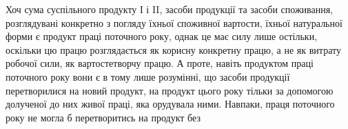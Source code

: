 Хоч сума суспільного продукту І і II, засоби продукції та засоби
споживання, розглядувані конкретно з погляду їхньої споживної вартости,
їхньої натуральної форми є продукт праці поточного року, однак це має
силу лише остільки, оскільки цю працю розглядається як корисну конкретну
працю, а не як витрату робочої сили, як вартостетворчу працю.
А проте, навіть продуктом праці поточного року вони є в тому лише розумінні,
що засоби продукції перетворилися на новий продукт, на продукт
цього року тільки за допомогою долученої до них живої праці, яка орудувала
ними. Навпаки, праця поточного року не могла б перетворитись на продукт без
\parbreak{}  %
